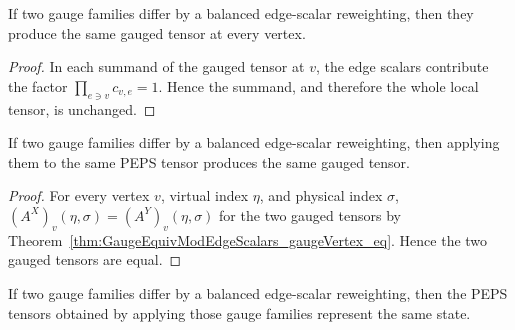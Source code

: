 \begin{theorem}%
    \label{thm:GaugeEquivModEdgeScalars_gaugeVertex_eq}
    \leanok
    If two gauge families differ by a balanced edge-scalar reweighting, then
    they produce the same gauged tensor at every vertex.
\end{theorem}

\begin{proof}\leanok{}
    In each summand of the gauged tensor at $v$, the edge scalars contribute
    the factor $\prod_{e\ni v}c_{v,e}=1$. Hence the summand, and therefore
    the whole local tensor, is unchanged.
\end{proof}

\begin{theorem}%
    \label{thm:GaugeEquivModEdgeScalars_applyGauge_eq}
    \leanok
    If two gauge families differ by a balanced edge-scalar reweighting, then
    applying them to the same PEPS tensor produces the same gauged tensor.
    \begin{center}
        \TNPEPSGaugeVertexAction
    \end{center}
\end{theorem}

\begin{proof}\leanok
    For every vertex $v$, virtual index $\eta$, and physical index $\sigma$,
    $(A^X)_v(\eta,\sigma)=(A^Y)_v(\eta,\sigma)$ for the two gauged tensors by
    Theorem~\ref{thm:GaugeEquivModEdgeScalars_gaugeVertex_eq}. Hence the
    two gauged tensors are equal.
\end{proof}

\begin{theorem}%
    \label{thm:GaugeEquivModEdgeScalars_applyGauge_sameState}
    \leanok
    If two gauge families differ by a balanced edge-scalar reweighting, then
    the PEPS tensors obtained by applying those gauge families represent the
    same state.
\end{theorem}

